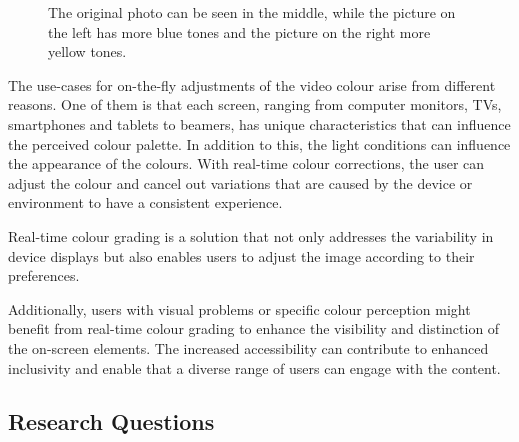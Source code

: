 \documentclass[../MasterThesis.tex]{subfiles}
\begin{document}
	
	\begin{figure}[H]
		\begin{center}
			\caption[Photo in three different colour tones (original, yellow, blue).]{The original photo can be seen in the middle, while the picture on the left has more blue tones and the picture on the right more yellow tones.}
			\label{figure:coloursblueandyellow}
		\end{center}
	\end{figure}
	The use-cases for on-the-fly adjustments of the video colour arise from different reasons. 
	One of them is that each screen, ranging from computer monitors, TVs, smartphones and tablets to beamers, has unique characteristics that can influence the perceived colour palette. 
	In addition to this, the light conditions can influence the appearance of the colours.
	With real-time colour corrections, the user can adjust the colour and cancel out variations that are caused by the device or environment to have a consistent experience.
	
	Real-time colour grading is a solution that not only addresses the variability in device displays but also enables users to adjust the image according to their preferences.
	
	Additionally, users with visual problems or specific colour perception might benefit from real-time colour grading to enhance the visibility and distinction of the on-screen elements. 
	The increased accessibility can contribute to enhanced inclusivity and enable that a diverse range of users can engage with the content.
	
	
	

	
	
	
	
	
	
	
	
	
	
	
	\subsection{Research Questions} \label{subsection:researchquestions}
	
\end{document}
